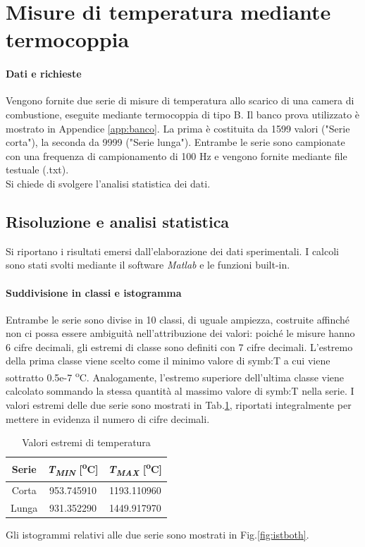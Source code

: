 \section{Misure di temperatura mediante termocoppia} \label{sez:misureT}
\paragraph{Dati e richieste}
Vengono fornite due serie di misure di temperatura allo scarico di una camera di combustione, eseguite mediante termocoppia di tipo B. Il banco prova utilizzato è mostrato in Appendice \ref{app:banco}. La prima è costituita da 1599 valori ("Serie corta"), la seconda da 9999 ("Serie lunga"). Entrambe le serie sono campionate con una frequenza di campionamento di 100 Hz e vengono fornite mediante file testuale (.txt).\\
Si chiede di svolgere l'analisi statistica dei dati.
\subsection{Risoluzione e analisi statistica}
Si riportano i risultati emersi dall'elaborazione dei dati sperimentali. I calcoli sono stati svolti mediante il software \textit{Matlab} e le funzioni built-in.
\paragraph{Suddivisione in classi e istogramma}
Entrambe le serie sono divise in 10 classi, di uguale ampiezza, costruite affinché non ci possa essere ambiguità nell'attribuzione dei valori: poiché le misure hanno 6 cifre decimali, gli estremi di classe sono definiti con 7 cifre decimali. L'estremo della prima classe viene scelto come il minimo valore di \gls{symb:T} a cui viene sottratto 0.5e-7 \textsuperscript{o}C. Analogamente, l'estremo superiore dell'ultima classe viene calcolato sommando la stessa quantità al massimo valore di \gls{symb:T} nella serie. I valori estremi delle due serie sono mostrati in Tab.\ref{tab:estremitemp}, riportati integralmente per mettere in evidenza il numero di cifre decimali.
\begin{table} [H]
	\centering
	\begin{tabular}{c|c|c}
		\toprule
		\toprule
		\textbf{Serie} & \textbf{\textit{T\textsubscript{MIN}} [\textsuperscript{o}C]} &\textbf{\textit{T\textsubscript{MAX}} [\textsuperscript{o}C]} \\
		\midrule
		\midrule
		Corta & 953.745910 & 1193.110960\\
		\midrule
		Lunga & 931.352290 & 1449.917970 \\
		\bottomrule
		\bottomrule
	\end{tabular}
\caption{Valori estremi di temperatura}
\label{tab:estremitemp}
\end{table}
Gli istogrammi relativi alle due serie sono mostrati in Fig.\ref{fig:istboth}.



